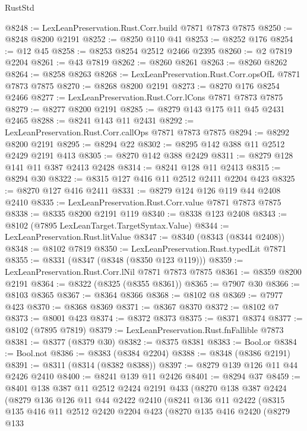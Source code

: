 \begin{lexlean}{RustStd}
\begin{coremodule}
{\begin{coremodule}
{{{{{{{{{{{{{{{{{{{{{{{{{{{{{{{{{{{{{{{{{{{{{{{{{{@8248 := LexLeanPreservation.Rust.Corr.build @7871 @7873 @7875
@8250 := @8248 @8200 @2191
@8252 := @8250 @110 @41
@8253 := @8252 @176
@8254 := @12 @45
@8258 := @8253 @8254 @2512 @2466 @2395
@8260 := @2 @7819 @2204
@8261 := @43 @7819
@8262 := @8260 @8261
@8263 := @8260 @8262
@8264 := @8258 @8263
@8268 := LexLeanPreservation.Rust.Corr.opsOfL @7871 @7873 @7875
@8270 := @8268 @8200 @2191
@8273 := @8270 @176 @8254 @2466
@8277 := LexLeanPreservation.Rust.Corr.lCons @7871 @7873 @7875
@8279 := @8277 @8200 @2191
@8285 := @8279 @143 @175 @11 @45 @2431 @2465
@8288 := @8241 @143 @11 @2431
@8292 := LexLeanPreservation.Rust.Corr.callOps @7871 @7873 @7875
@8294 := @8292 @8200 @2191
@8295 := @8294 @22
@8302 := @8295 @142 @388 @11 @2512 @2429 @2191 @413
@8305 := @8270 @142 @388 @2429
@8311 := @8279 @128 @141 @11 @387 @2413 @2428
@8314 := @8241 @128 @11 @2413
@8315 := @8294 @30
@8322 := @8315 @127 @416 @11 @2512 @2411 @2204 @423
@8325 := @8270 @127 @416 @2411
@8331 := @8279 @124 @126 @119 @44 @2408 @2410
@8335 := LexLeanPreservation.Rust.Corr.value @7871 @7873 @7875
@8338 := @8335 @8200 @2191 @119
@8340 := @8338 @123 @2408
@8343 := @8102 (@7895 LexLeanTarget.TargetSyntax.Value)
@8344 := LexLeanPreservation.Rust.litValue
@8347 := @8340 (@8343 (@8344 @2408))
@8348 := @8102 @7819
@8350 := LexLeanPreservation.Rust.typedLit @7871
@8355 := @8331 (@8347 (@8348 (@8350 @123 @119)))
@8359 := LexLeanPreservation.Rust.Corr.lNil @7871 @7873 @7875
@8361 := @8359 @8200 @2191
@8364 := @8322 (@8325 (@8355 @8361))
@8365 := @7907 @30
@8366 := @8103 @8365
@8367 := @8364 @8366
@8368 := @8102 @8
@8369 := @7977 @423
@8370 := @8368 @8369
@8371 := @8367 @8370
@8372 := @8102 @7
@8373 := @8001 @423
@8374 := @8372 @8373
@8375 := @8371 @8374
@8377 := @8102 (@7895 @7819)
@8379 := LexLeanPreservation.Rust.fnFallible @7873
@8381 := @8377 (@8379 @30)
@8382 := @8375 @8381
@8383 := Bool.or
@8384 := Bool.not
@8386 := @8383 (@8384 @2204)
@8388 := @8348 (@8386 @2191)
@8391 := @8311 (@8314 (@8382 @8388))
@8397 := @8279 @139 @126 @11 @44 @2426 @2410
@8400 := @8241 @139 @11 @2426
@8401 := @8294 @37
@8459 := @8401
    @138
    @387
    @11
    @2512
    @2424
    @2191
    @433
    (@8270
      @138
      @387
      @2424
      (@8279
        @136
        @126
        @11
        @44
        @2422
        @2410
        (@8241
          @136
          @11
          @2422
          (@8315
            @135
            @416
            @11
            @2512
            @2420
            @2204
            @423
            (@8270
              @135
              @416
              @2420
              (@8279
                @133
}}}}}}}}}}}}}}}}}}}}}}}}}}}}}}}}}}}}}}}}}}}}}}}}}}
\end{coremodule}}
\end{coremodule}
\end{lexlean}
